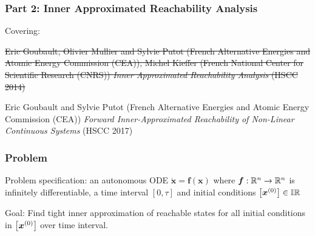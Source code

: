 \documentclass{beamer}
\begin{document}
\begin{frame}
    \frametitle{Part 2: Inner Approximated Reachability Analysis}

    Covering:


    \vspace{2mm}
    \sout{Eric Goubault, Olivier Mullier and Sylvie Putot (French Alternative Energies and Atomic Energy Commission (CEA)), Michel Kieffer (French National Center for Scientific Research (CNRS))
    \textit{Inner Approximated Reachability Analysis} (HSCC 2014)}

    \vspace{2mm}
    Eric Goubault and Sylvie Putot (French Alternative Energies and Atomic Energy Commission (CEA))
    \textit{Forward Inner-Approximated Reachability of Non-Linear Continuous Systems} (HSCC 2017)
\end{frame}


\newcommand{\intervalbox}[1]{\arr{\bm{x}^{(#1)}}}
\newcommand{\tintervalbox}[1]{\arr{\tilde{\bm{x}}^{(#1)}}}
\newcommand{\enclosure}[1]{\arr{\bm{r}^{(#1)}}}
\newcommand{\tenclosure}[1]{\arr{\tilde{\bm{r}}^{(#1)}}}
\newcommand{\autof}[1]{\bm{f}^{[#1]}}

\begin{frame}
    \frametitle{Problem}
    
    Problem specification:
    an autonomous ODE $\dot{\bm{x}} = \bm{f}(\bm{x})$ where $\bm{f}: \mathbb R^n \rightarrow \mathbb R^n$ is infinitely differentiable, a time interval $[0,\tau]$ and initial conditions $\intervalbox{0} \in \RIntervals$

    \vspace{7mm}
    Goal:
    Find tight inner approximation of reachable states for all initial conditions in $\intervalbox{0}$ over time interval.
\end{frame}
\end{document}
